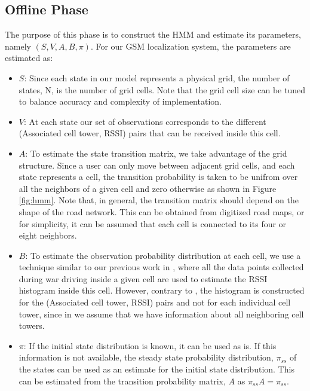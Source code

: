 \documentclass[conference]{IEEEtran}
\begin{document}
\subsection{Offline Phase}
The purpose of this phase is to construct the HMM and estimate its
parameters, namely $(S, V, A, B, \pi)$. For our GSM localization
system, the parameters are estimated as:
\begin{itemize}
  \item $S$: Since each state in our model represents a physical
  grid, the number of states, N, is the number of grid cells. Note
  that the grid cell size can be tuned to balance accuracy and
  complexity of implementation.

  \item $V$: At each state our set of observations corresponds to the different (Associated cell tower,
  RSSI) pairs that can be received inside this cell.

  \item $A$: To estimate the state transition matrix, we take
  advantage of the grid structure. Since a user can only move
  between adjacent grid cells, and each state represents a cell, the
  transition probability is taken to be unifrom over all the neighbors of a given cell and zero otherwise as shown in Figure
  \ref{fig:hmm}. Note that, in general, the transition matrix should
  depend on the shape of the road network. This can be obtained from
  digitized road maps, or for simplicity, it can be assumed that
  each cell is connected to its four or eight neighbors.

  \item $B$: To estimate the observation probability distribution at
  each cell, we use a technique similar to our previous work in
  \cite{CellSense}, where all the data points collected during war driving inside a given cell are used to estimate the RSSI histogram inside this cell.
  However, contrary to \cite{CellSense}, the histogram is constructed for the (Associated cell tower, RSSI)
  pairs and not for each individual cell tower, since in \cite{CellSense} we assume that we have information about all neighboring cell towers.

  \item $\pi$: If the initial state distribution is known, it can be used as is. If this information is not available, the steady state probability
  distribution, $\pi_{ss}$
  of the states can be used as an estimate for the initial state distribution. This can be estimated from the transition probability matrix, $A$
  as $\pi_{ss}A=\pi_{ss}$.
\end{itemize}
\end{document}
